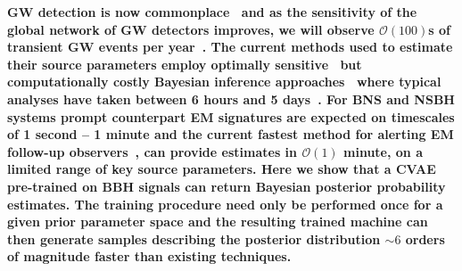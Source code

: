 \documentclass[%
showpacs,
 amsmath,amssymb,
 aps,
 twocolumn,
 prl,
 reprint,
floatfix,
]{revtex4-1}
\begin{document}
%
%
%
\textbf{ 
%
%
\ac{GW} detection is now
commonplace~\cite{PhysRevX.6.041015,PhysRevLett.119.161101} and as the
sensitivity of the global network of \ac{GW} detectors improves, we will
observe $\mathcal{O}(100)$s of transient \ac{GW} events per
year~\cite{2018LRR....21....3A}. The current methods used to estimate their
source parameters employ optimally sensitive~\cite{2009CQGra..26o5017S} but
computationally costly Bayesian inference approaches~\cite{1409.7215} where
typical analyses have taken between 6 hours and 5 days~\cite{gracedb_O3}.
%
%
For \ac{BNS} and \ac{NSBH} systems prompt counterpart \ac{EM} signatures are
expected on timescales of 1 second -- 1 minute and the current fastest method
for alerting \ac{EM} follow-up observers~\cite{2016PhRvD..93b4013S}, can
provide estimates in $\mathcal{O}(1)$ minute, on a limited range of key source
parameters. 
%
%
Here we show that a \ac{CVAE}~\cite{1904.06264,1812.04405} pre-trained on
\ac{BBH} signals can return Bayesian posterior probability estimates. The
training procedure need only be performed once for a given prior parameter
space and the resulting trained machine can then generate samples describing
the posterior distribution $\sim 6$ orders of magnitude faster than existing
techniques.}
%
\end{document}

